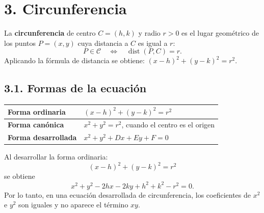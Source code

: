 \documentclass[11pt]{article}
\begin{document}
\section*{3. Circunferencia}
\begin{mdframed}[style=teoSty,frametitle={Definición de circunferencia}]
La \textbf{circunferencia} de centro $C=(h,k)$ y radio $r>0$ es el lugar geométrico de los puntos $P=(x,y)$ cuya distancia a $C$ es igual a $r$:
\[
P\in\mathcal C
\quad\Longleftrightarrow\quad
\operatorname{dist}(P,C)=r.
\]
Aplicando la fórmula de distancia se obtiene: \quad $\displaystyle \boxed{(x-h)^2+(y-k)^2=r^2.}$ 
\end{mdframed}
 
\subsection*{3.1. Formas de la ecuación}

\begin{center}
\renewcommand{\arraystretch}{1.5}
\begin{tabular}{>{\bfseries}m{48mm}|m{83mm}}
Forma ordinaria & $(x-h)^2+(y-k)^2=r^2$ \\
\hline
Forma canónica & $x^2+y^2=r^2$, cuando el centro es el origen \\
\hline
Forma desarrollada & $x^2+y^2+Dx+Ey+F=0$ \\
\end{tabular}
\end{center}

Al desarrollar la forma ordinaria:
\[
(x-h)^2+(y-k)^2=r^2
\]
se obtiene
\[
x^2+y^2-2hx-2ky+h^2+k^2-r^2=0.
\]
Por lo tanto, en una ecuación desarrollada de circunferencia, los coeficientes de $x^2$ e $y^2$ son iguales y no aparece el término $xy$.

\begin{center}
\end{center}
\end{document}
